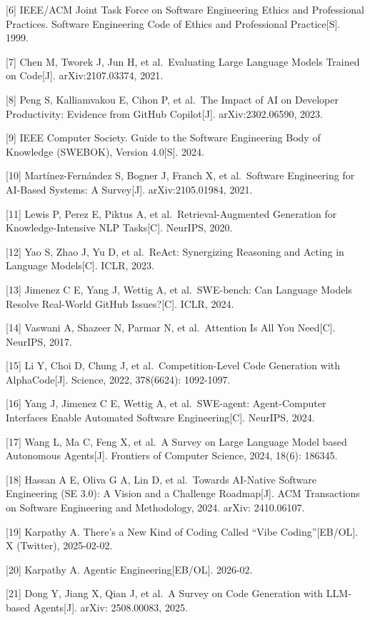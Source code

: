 \documentclass[
]{ctexbook}
\begin{document}
{[}6{]} IEEE/ACM Joint Task Force on Software Engineering Ethics and
Professional Practices. Software Engineering Code of Ethics and
Professional Practice{[}S{]}. 1999.

{[}7{]} Chen M, Tworek J, Jun H, et al.~Evaluating Large Language Models
Trained on Code{[}J{]}. arXiv:2107.03374, 2021.

{[}8{]} Peng S, Kalliamvakou E, Cihon P, et al.~The Impact of AI on
Developer Productivity: Evidence from GitHub Copilot{[}J{]}.
arXiv:2302.06590, 2023.

{[}9{]} IEEE Computer Society. Guide to the Software Engineering Body of
Knowledge (SWEBOK), Version 4.0{[}S{]}. 2024.

{[}10{]} Martínez-Fernández S, Bogner J, Franch X, et al.~Software
Engineering for AI-Based Systems: A Survey{[}J{]}. arXiv:2105.01984,
2021.

{[}11{]} Lewis P, Perez E, Piktus A, et al.~Retrieval-Augmented
Generation for Knowledge-Intensive NLP Tasks{[}C{]}. NeurIPS, 2020.

{[}12{]} Yao S, Zhao J, Yu D, et al.~ReAct: Synergizing Reasoning and
Acting in Language Models{[}C{]}. ICLR, 2023.

{[}13{]} Jimenez C E, Yang J, Wettig A, et al.~SWE-bench: Can Language
Models Resolve Real-World GitHub Issues?{[}C{]}. ICLR, 2024.

{[}14{]} Vaswani A, Shazeer N, Parmar N, et al.~Attention Is All You
Need{[}C{]}. NeurIPS, 2017.

{[}15{]} Li Y, Choi D, Chung J, et al.~Competition-Level Code Generation
with AlphaCode{[}J{]}. Science, 2022, 378(6624): 1092-1097.

{[}16{]} Yang J, Jimenez C E, Wettig A, et al.~SWE-agent: Agent-Computer
Interfaces Enable Automated Software Engineering{[}C{]}. NeurIPS, 2024.

{[}17{]} Wang L, Ma C, Feng X, et al.~A Survey on Large Language Model
based Autonomous Agents{[}J{]}. Frontiers of Computer Science, 2024,
18(6): 186345.

{[}18{]} Hassan A E, Oliva G A, Lin D, et al.~Towards AI-Native Software
Engineering (SE 3.0): A Vision and a Challenge Roadmap{[}J{]}. ACM
Transactions on Software Engineering and Methodology, 2024. arXiv:
2410.06107.

{[}19{]} Karpathy A. There's a New Kind of Coding Called ``Vibe
Coding''{[}EB/OL{]}. X (Twitter), 2025-02-02.

{[}20{]} Karpathy A. Agentic Engineering{[}EB/OL{]}. 2026-02.

{[}21{]} Dong Y, Jiang X, Qian J, et al.~A Survey on Code Generation
with LLM-based Agents{[}J{]}. arXiv: 2508.00083, 2025.
\end{document}
